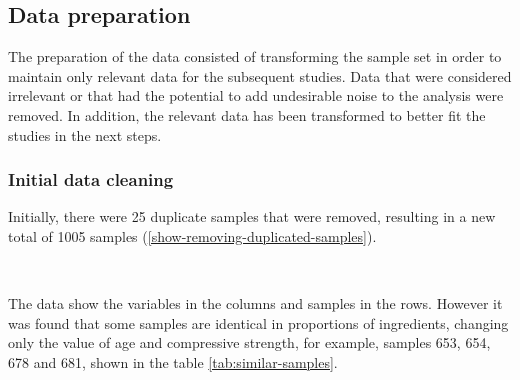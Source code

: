 \documentclass[]{article}
\begin{document}
\hypertarget{data-preparation}{%
\subsection{Data preparation}\label{data-preparation}}

The preparation of the data consisted of transforming the sample set in
order to maintain only relevant data for the subsequent studies. Data
that were considered irrelevant or that had the potential to add
undesirable noise to the analysis were removed. In addition, the
relevant data has been transformed to better fit the studies in the next
steps.

\hypertarget{initial-data-cleaning}{%
\subsubsection{Initial data cleaning}\label{initial-data-cleaning}}

Initially, there were 25 duplicate samples that were removed, resulting
in a new total of 1005 samples (\ref{show-removing-duplicated-samples}).

~

The data show the variables in the columns and samples in the rows.
However it was found that some samples are identical in proportions of
ingredients, changing only the value of age and compressive strength,
for example, samples 653, 654, 678 and 681, shown in the table
\ref{tab:similar-samples}.

~

\begin{table}[H]

\caption{\label{tab:similar-samples}Samples with same composition}
\centering
{}
\end{table}
\end{document}

